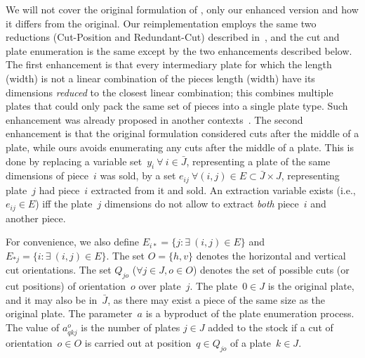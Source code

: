 \documentclass[9pt]{entcs}
\begin{document}
We will not cover the original formulation of \cite{furini:2016}, only our enhanced version and how it differs from the original.
Our reimplementation employs the same two reductions (Cut-Position and Redundant-Cut) described in~\cite{furini:2016}, and the cut and plate enumeration is the same except by the two enhancements described below.
The first enhancement is that every intermediary plate for which the length (width) is not a linear combination of the pieces length (width) have its dimensions \emph{reduced} to the closest linear combination; this combines multiple plates that could only pack the same set of pieces into a single plate type.
Such enhancement was already proposed in another contexts~\cite{alvarez:2009,dolatabadi:2012}.
The second enhancement is that the original formulation considered cuts after the middle of a plate, while ours avoids enumerating any cuts after the middle of a plate.
This is done by replacing a variable set~\(y_i~\forall~i \in \bar{J}\), representing a plate of the same dimensions of piece~\(i\) was sold, by a set \(e_{ij}~\forall (i, j) \in E \subset \bar{J} \times J\), representing plate~\(j\) had piece~\(i\) extracted from it and sold.
An extraction variable exists (i.e., \(e_{ij} \in E\)) iff the plate~\(j\) dimensions do not allow to extract \emph{both} piece~\(i\) and another piece.

For convenience, we also define \(E_{i*} = \{ j : \exists~(i, j) \in E \}\) and \(E_{*j} = \{i : \exists~(i, j) \in E \}\).
The set \(O = \{h, v\}\) denotes the horizontal and vertical cut orientations.
The set \(Q_{jo}\) (\(\forall j \in J, o \in O\)) denotes the set of possible cuts (or cut positions) of orientation~\(o\) over plate~\(j\).
The plate~\(0 \in J\) is the original plate, and it may also be in~\(\bar{J}\), as there may exist a piece of the same size as the original plate.
The parameter~\(a\) is a byproduct of the plate enumeration process.
The value of \(a^o_{qkj}\) is the number of plates \(j \in J\) added to the stock if a cut of orientation~\(o \in O\) is carried out at position~\(q \in Q_{jo}\) of a plate~\(k \in J\).
\end{document}
